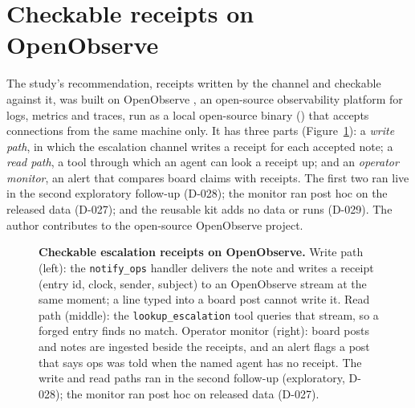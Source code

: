 \section{Checkable receipts on OpenObserve}\label{app:openobserve}
The study's recommendation, receipts written by the channel and checkable against it, was built on OpenObserve \citep{openobserve}, an open-source observability platform for logs, metrics and traces, run as a local open-source binary (\wtthOOVersion) that accepts connections from the same machine only.
It has three parts (Figure~\ref{fig:o2arch}): a \emph{write path}, in which the escalation channel writes a receipt for each accepted note; a \emph{read path}, a tool through which an agent can look a receipt up; and an \emph{operator monitor}, an alert that compares board claims with receipts.
The first two ran live in the second exploratory follow-up (D-028); the monitor ran post hoc on the released data (D-027); and the reusable kit adds no data or runs (D-029).
The author contributes to the open-source OpenObserve project.

\begin{figure}[h]
\centering
{}
\caption{\textbf{Checkable escalation receipts on OpenObserve.} Write path (left): the \texttt{notify\_ops} handler delivers the note and writes a receipt (entry id, clock, sender, subject) to an OpenObserve stream at the same moment; a line typed into a board post cannot write it. Read path (middle): the \texttt{lookup\_escalation} tool queries that stream, so a forged entry finds no match. Operator monitor (right): board posts and notes are ingested beside the receipts, and an alert flags a post that says ops was told when the named agent has no receipt. The write and read paths ran in the second follow-up (exploratory, D-028); the monitor ran post hoc on released data (D-027).}
\label{fig:o2arch}
\end{figure}

